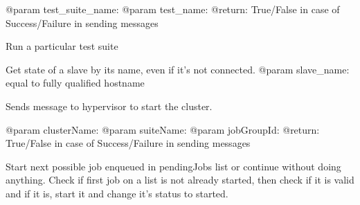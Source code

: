 \documentclass[letterpaper,10pt,english]{sphinxmanual}
\begin{document}
\begin{fulllineitems}
\begin{fulllineitems}
@param test\_suite\_name:
@param test\_name:
@return: True/False in case of Success/Failure in sending messages

\end{fulllineitems}


\begin{fulllineitems}
\label{ref-manual/XrdTestMaster:XrdTestMaster.XrdTestMaster.runTestSuite}
Run a particular test suite

\end{fulllineitems}


\begin{fulllineitems}
\label{ref-manual/XrdTestMaster:XrdTestMaster.XrdTestMaster.selectHypervisor}
\end{fulllineitems}


\begin{fulllineitems}
\label{ref-manual/XrdTestMaster:XrdTestMaster.XrdTestMaster.slaveState}
Get state of a slave by its name, even if it's not connected.
@param slave\_name: equal to fully qualified hostname

\end{fulllineitems}


\begin{fulllineitems}
\label{ref-manual/XrdTestMaster:XrdTestMaster.XrdTestMaster.startCluster}
Sends message to hypervisor to start the cluster.

@param clusterName:
@param suiteName:
@param jobGroupId:
@return: True/False in case of Success/Failure in sending messages

\end{fulllineitems}


\begin{fulllineitems}
\label{ref-manual/XrdTestMaster:XrdTestMaster.XrdTestMaster.startNextJob}
Start next possible job enqueued in pendingJobs list or continue
without doing anything. Check if first job on a list is not already
started, then check if it is valid and if it is, start it and change
it's status to started.


\end{fulllineitems}
\end{fulllineitems}
\end{document}
